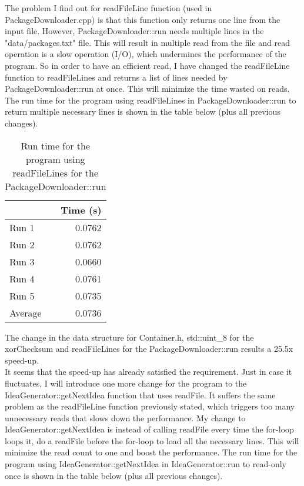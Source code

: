 \documentclass[12pt]{article}
\begin{document}
\noindent
The problem I find out for readFileLine function (used in PackageDownloader.cpp) is that this function only returns one line from the input file. However, PackageDownloader::run needs multiple lines in the "data/packages.txt" file. This will result in multiple read from the file and read operation is a slow operation (I/O), which undermines the performance of the program. So in order to have an efficient read, I have changed the readFileLine function to readFileLines and returns a list of lines needed by PackageDownloader::run at once. This will minimize the time wasted on reads. The run time for the program using readFileLines in PackageDownloader::run to return multiple necessary lines is shown in the table below (plus all previous changes).

\begin{table}[H]
  \centering
  \begin{tabular}{lr}
    & {\bf Time (s)} \\
    \hline
    Run 1 & 0.0762 \\
    Run 2 & 0.0762 \\
    Run 3 & 0.0660 \\
    Run 4 & 0.0761 \\
    Run 5 & 0.0735 \\
    \hline
    Average & 0.0736 \\
  \end{tabular}
  \caption{Run time for the program using readFileLines for the PackageDownloader::run}
  \label{tbl-fib-sequential}
\end{table}

\noindent 
The change in the data structure for Container.h, std::uint\_8 for the xorChecksum and readFileLines for the PackageDownloader::run results a 25.5x speed-up. \\

\noindent 
It seems that the speed-up has already satisfied the requirement. Just in case it fluctuates, I will introduce one more change for the program to the IdeaGenerator::getNextIdea function that uses readFile. It suffers the same problem as the readFileLine function previously stated, which triggers too many unnecessary reads that slows down the performance. My change to IdeaGenerator::getNextIdea is instead of calling readFile every time the for-loop loops it, do a readFile before the for-loop to load all the necessary lines. This will minimize the read count to one and boost the performance. The run time for the program using IdeaGenerator::getNextIdea in IdeaGenerator::run to read-only once is shown in the table below (plus all previous changes).
\end{document}
